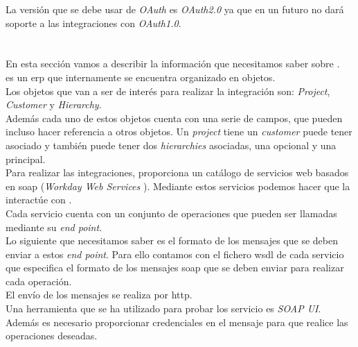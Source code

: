 La versión que se debe usar de \textit{OAuth} es \textit{OAuth2.0} ya que \hs{} en un futuro no dará soporte a las integraciones con \textit{OAuth1.0}.


\section{\wday{}}

En esta sección vamos a describir la información que necesitamos saber sobre \wday.\\

\wday{} es un \acrshort{erp} que internamente se encuentra organizado en objetos.\\
 
Los objetos que van a ser de interés para realizar la integración son:
\textit{Project}, \textit{Customer} y \textit{Hierarchy}.\\

Además cada uno de estos objetos cuenta con una serie de campos, que pueden incluso hacer referencia a otros objetos.
Un \textit{project} tiene un \textit{customer} puede tener asociado y también puede tener dos \textit{hierarchies} asociadas, una opcional y una principal.\\


Para realizar las integraciones, \wday{} proporciona un catálogo de servicios web basados en \acrshort{soap} (\textit{Workday Web Services} \cite{wws}). 
Mediante estos servicios podemos hacer que la \iface{} interactúe con \wday{}.\\

Cada servicio cuenta con un conjunto de operaciones que pueden ser llamadas mediante su \textit{end point}.\\


Lo siguiente que necesitamos saber es el formato de los mensajes que se deben enviar a estos \textit{end point}. Para ello contamos con el fichero \acrshort{wsdl} de cada servicio que especifica el formato de los mensajes \acrshort{soap} que se deben enviar para realizar cada operación.\\


El envío de los mensajes se realiza por \acrshort{http}.\\

Una herramienta que se ha utilizado para probar los servicio es \textit{SOAP UI}.\\

Además es necesario proporcionar credenciales en el mensaje para que \wday{} realice las operaciones deseadas.\\

